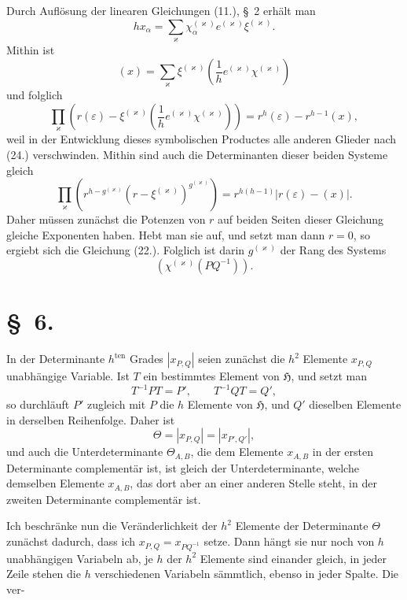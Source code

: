 \documentclass[11pt]{article}
\newcommand{\grp}{\mathfrak{H}}
\begin{document}
Durch Auflösung der linearen Gleichungen (11.), \S~2 erhält man
\begin{equation*}\tag{26.}
hx_\alpha=\sum_\varkappa \chi_\alpha^{(\varkappa)}e^{(\varkappa)}\xi^{(\varkappa)}.
\end{equation*}
Mithin ist
\begin{equation*}\tag{27.}
(x)=\sum_\varkappa \xi^{(\varkappa)}\left(\frac{1}{h}e^{(\varkappa)}\chi^{(\varkappa)}\right)
\end{equation*}
und folglich
\[
\prod_\varkappa\left(r(\varepsilon)-\xi^{(\varkappa)}\left(\frac{1}{h}e^{(\varkappa)}\chi^{(\varkappa)}\right)\right)=r^h(\varepsilon)-r^{h-1}(x),
\]
weil in der Entwicklung dieses symbolischen Productes alle anderen Glieder nach (24.) verschwinden. Mithin sind auch die Determinanten dieser beiden Systeme gleich
\[
\prod_\varkappa\left(r^{h-g^{(\varkappa)}}(r-\xi^{(\varkappa)})^{g^{(\varkappa)}}\right)=r^{h(h-1)}\left|r(\varepsilon)-(x)\right|.
\]
Daher müssen zunächst die Potenzen von $r$ auf beiden Seiten dieser Gleichung gleiche Exponenten haben. Hebt man sie auf, und setzt man dann $r=0$, so ergiebt sich die Gleichung (22.). Folglich ist darin $g^{(\varkappa)}$ der Rang des Systems
\begin{equation*}\tag{28.}
\left(\chi^{(\varkappa)}(PQ^{-1})\right).
\end{equation*}

\section*{\S~6.}

In der Determinante $h^{\text{ten}}$ Grades $\left|x_{P,Q}\right|$ seien zunächst die $h^2$ Elemente $x_{P,Q}$ unabhängige Variable. Ist $T$ ein bestimmtes Element von $\grp$, und setzt man
\[
T^{-1}PT=P',\qquad T^{-1}QT=Q',
\]
so durchläuft $P'$ zugleich mit $P$ die $h$ Elemente von $\grp$, und $Q'$ dieselben Elemente in derselben Reihenfolge. Daher ist
\begin{equation*}\tag{1.}
\Theta=\left|x_{P,Q}\right|=\left|x_{P',Q'}\right|,
\end{equation*}
und auch die Unterdeterminante $\Theta_{A,B}$, die dem Elemente $x_{A,B}$ in der ersten Determinante complementär ist, ist gleich der Unterdeterminante, welche demselben Elemente $x_{A,B}$, das dort aber an einer anderen Stelle steht, in der zweiten Determinante complementär ist.

Ich beschränke nun die Veränderlichkeit der $h^2$ Elemente der Determinante $\Theta$ zunächst dadurch, dass ich $x_{P,Q}=x_{PQ^{-1}}$ setze. Dann hängt sie nur noch von $h$ unabhängigen Variabeln ab, je $h$ der $h^2$ Elemente sind einander gleich, in jeder Zeile stehen die $h$ verschiedenen Variabeln sämmtlich, ebenso in jeder Spalte. Die ver-
\end{document}
